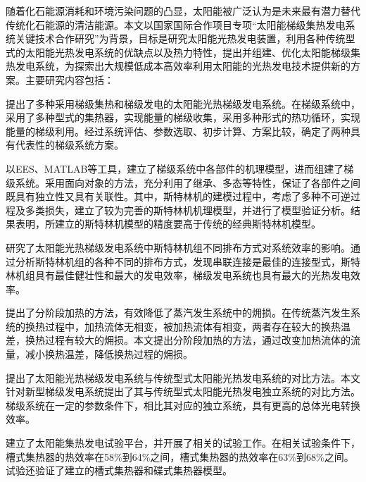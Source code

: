 {随着化石能源消耗和环境污染问题的凸显，太阳能被广泛认为是未来最有潜力替代传统化石能源的清洁能源。本文以国家国际合作项目专项“太阳能梯级集热发电系统关键技术合作研究”为背景，目标是研究太阳能光热发电装置，利用各种传统型式的太阳能光热发电系统的优缺点以及热力特性，提出并组建、优化太阳能梯级集热发电系统，为探索出大规模低成本高效率利用太阳能的光热发电技术提供新的方案。主要研究内容包括：

提出了多种采用梯级集热和梯级发电的太阳能光热梯级发电系统。在梯级系统中，采用了多种型式的集热器，实现能量的梯级收集，采用多种形式的热功循环，实现能量的梯级利用。经过系统评估、参数选取、初步计算、方案比较，确定了两种具有代表性的梯级系统方案。

以EES、MATLAB等工具，建立了梯级系统中各部件的机理模型，进而组建了梯级系统。采用面向对象的方法，充分利用了继承、多态等特性，保证了各部件之间既具有独立性又具有关联性。其中，斯特林机的建模过程中，考虑了多种不可逆过程及多类损失，建立了较为完善的斯特林机机理模型，并进行了模型验证分析。结果表明，所建立的斯特林机模型的精度要高于传统的经典斯特林机模型。

研究了太阳能光热梯级发电系统中斯特林机组不同排布方式对系统效率的影响。通过分析斯特林机组的各种不同的排布方式，发现串联连接是最佳的连接型式，斯特林机组具有最佳健壮性和最大的发电效率，梯级发电系统也具有最大的光热发电效率。

提出了分阶段加热的方法，有效降低了蒸汽发生系统中的㶲损。在传统蒸汽发生系统的换热过程中，加热流体无相变，被加热流体有相变，两者存在较大的换热温差，换热过程有较大的㶲损。本文提出分阶段加热的方法，通过改变加热流体的流量，减小换热温差，降低换热过程的㶲损。

提出了太阳能光热梯级发电系统与传统型式太阳能光热发电系统的对比方法。本文针对新型梯级发电系统提出了其与传统型式太阳能光热发电独立系统的对比方法。梯级系统在一定的参数条件下，相比其对应的独立系统，具有更高的总体光电转换效率。

建立了太阳能集热发电试验平台，并开展了相关的试验工作。在相关试验条件下，槽式集热器的热效率在58\%到64\%之间，槽式集热器的热效率在63\%到68\%之间。试验还验证了建立的槽式集热器和碟式集热器模型。
}

